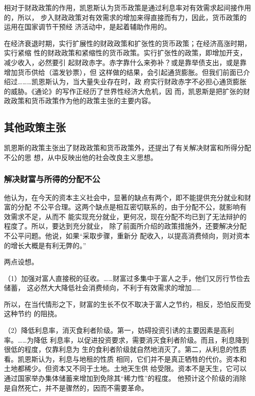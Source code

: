 相对于财政政策的作用，凯恩斯认为货币政策是通过利息率对有效需求起间接作用的，所以，
步入财政政策对有效需求的增加来得直接而有力，因此，货币政策的运用在国家调节干预经
济活动中，是起着辅助作用的。

在经济衰退时期，实行扩展性的财政政策和扩张性的货币政策；在经济高涨时期，实行紧缩
性的财政政策和紧缩性的货币政策。实行扩张性的政策，即增加开支，减少收入，必然要引
起财政赤字。赤字靠什么来弥补？或是靠举债支出，或是靠增加货币供给（滥发钞票），但
这样做的结果，会引起通货膨胀。但我们前面已介绍过………凯恩斯认为，当大量失业存在时，政
府实行财政赤字不必担心通货膨胀的威胁。《通论》的写作正经历了世界性经济大危机，因
而，凯恩斯是把扩张的财政政策和货币政策作为他的政策主张的主要内容。

\subsection{其他政策主张}

凯恩斯的政策主张出了财政政策和货币政策外，还提出了有关解决财富和所得分配不公的思
想，从中反映出他的社会改良主义思想。

\subsubsection{解决财富与所得的分配不公}

他认为，在今天的资本主义社会中，显著的缺点有两个，即不能提供充分就业和财富的分配
不公平合理。这两个缺点是相互密切联系的，由于分配不公，就影响有效需求不足，从而不
能实现充分就业，更何况，现在分配不均已到了无法辩护的程度了。所以，要达到充分就业，
除了前面所介绍的政策措施外，还要解决分配不公平问题。他说，如果“采取步骤，重新分
配收入，以提高消费倾向，则对资本的增长大概是有利无弊的。”

两点设想。

（1）加强对富人直接税的征收。……财富过多集中于富人之手，他们又厉行节俭去储蓄，
这必然大大降低社会消费倾向，不利于有效需求的增加……

所以，在当代情形之下，财富的生长不仅不取决于富人之节约，相反，恐怕反而受这种节约
的阻挠。

（2）降低利息率，消灭食利者阶级。第一，妨碍投资引诱的主要因素是高利率。……为降低
利息率，以促进投资要求，需要消灭食利者阶级。而且，利息降到很低的程度，仅靠利息为
生的食利者阶级就自然地消灭了。第二，从利息的性质看。凯恩斯认为，利息与地租的性质
相同，它们并不是真正牺牲的代价。资本和土地都稀少。但资本又不同于土地。土地天生供
给受限。资本不是天生，它可以通过国家举办集体储蓄来增加到免除其“稀力性”的程度。
他预计这个阶级的消除是自然死亡，并不是骤然的，因而不需要革命。

